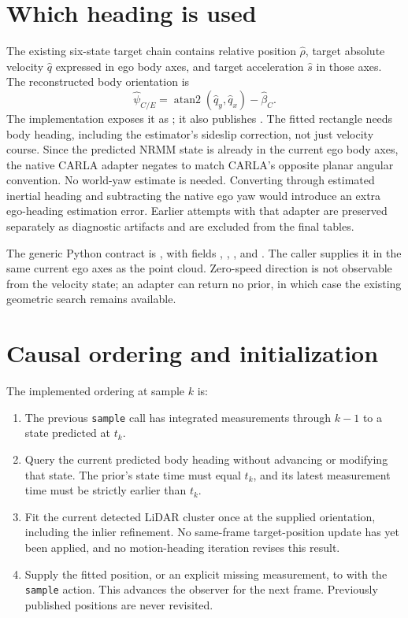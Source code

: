 \documentclass[11pt]{article}
\begin{document}
\section{Which heading is used}
The existing six-state target chain contains relative position $\hat\rho$,
target absolute velocity $\hat q$ expressed in ego body axes, and target
acceleration $\hat s$ in those axes. The reconstructed body orientation is
\[
 \hat\psi_{C/E}=\operatorname{atan2}(\hat q_y,\hat q_x)-\hat\beta_C.
\]
The implementation exposes it as ; it also
publishes . The fitted rectangle needs body
heading, including the estimator's sideslip correction, not just velocity
course. Since the predicted NRMM state is already in the current ego body
axes, the native CARLA adapter negates  to match
CARLA's opposite planar angular convention. No world-yaw estimate is needed.
Converting through estimated inertial heading and subtracting the native ego
yaw would introduce an extra ego-heading estimation error. Earlier attempts
with that adapter are preserved separately as diagnostic artifacts and are
excluded from the final tables.

The generic Python contract is , with fields
, , , and
. The caller supplies it in the
same current ego axes as the point cloud. Zero-speed direction is not
observable from the velocity state; an adapter can return no prior, in which
case the existing geometric search remains available.

\section{Causal ordering and initialization}
The implemented ordering at sample $k$ is:
\begin{enumerate}
\item The previous \texttt{sample} call has integrated measurements through
$k-1$ to a state predicted at $t_k$.
\item Query the current predicted body heading without advancing or modifying
that state. The prior's state time must equal $t_k$, and its latest measurement
time must be strictly earlier than $t_k$.
\item Fit the current detected LiDAR cluster once at the supplied orientation,
including the inlier refinement. No same-frame target-position update has yet
been applied, and no motion-heading iteration revises this result.
\item Supply the fitted position, or an explicit missing measurement, to
 with the \texttt{sample} action. This advances the observer
for the next frame. Previously published positions are never revisited.
\end{enumerate}
\end{document}
